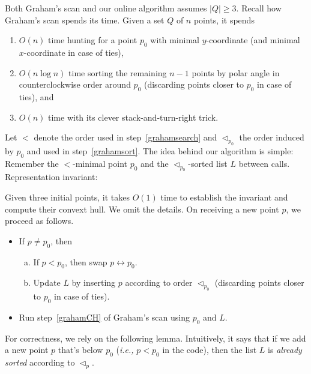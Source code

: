 \documentclass[a4paper]{article}
\newcommand{\swap}{\leftrightarrow}
\newcommand{\ie}{\emph{i.e.,} }
\begin{document}
Both Graham's scan and our online algorithm assumes $|Q| \ge 3$.
Recall how Graham's scan spends its time.
Given a set $Q$ of $n$ points, it spends
\begin{enumerate}

\item \label{grahamsearch} $O(n)$ time hunting for a point $p_0$ with minimal $y$-coordinate (and minimal $x$-coordinate in case of ties),

\item \label{grahamsort} $O(n \log n)$ time sorting the remaining $n-1$ points by polar angle in counterclockwise order around $p_0$ (discarding points closer to $p_0$ in case of ties), and

\item \label{grahamCH} $O(n)$ time with its clever stack-and-turn-right trick.

\end{enumerate}
\newcommand{\below}{<}%
\newcommand*{\ccw}[1]{\lhd_{#1}}%
Let $\below$ denote the order used in step~\eqref{grahamsearch} and $\ccw{p_0}$ the order induced by $p_0$ and used in step~\eqref{grahamsort}.
The idea behind our algorithm is simple:
Remember the $\below$-minimal point $p_0$ and the $\ccw{p_0}$-sorted list $L$ between calls.
Representation invariant:
Given three initial points, it takes $O(1)$ time to establish the invariant and compute their convext hull.
We omit the details.
On receiving a new point $p$, we proceed as follows.
\begin{itemize}

	\item If $p \not= p_0$, then
	
	\begin{enumerate}[(a)]
		\item If $p \below p_0$, then swap $p \swap p_0$.
		
		\item \label{onlineL} Update $L$ by inserting $p$ according to order $\ccw{p_0}$ (discarding points closer to $p_0$ in case of ties).
		
	\end{enumerate}
	
	\item Run step~\eqref{grahamCH} of Graham's scan using $p_0$ and $L$.
	
\end{itemize}
For correctness, we rely on the following lemma.
Intuitively, it says that if we add a new point $p$ that's below $p_0$ (\ie $p \below p_0$ in the code), then the list $L$ is \emph{already sorted} according to $\ccw{p}$.
\end{document}
